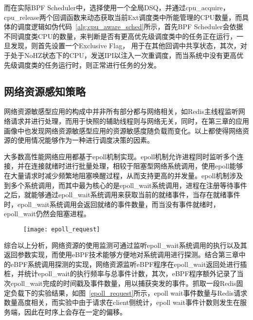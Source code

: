 而在实际BPF Scheduler中，选择使用一个全局DSQ，并通过cpu\_acquire，cpu\_release两个回调函数来动态获取当前Ext调度类中所能管理的CPU数量，而具体的调度逻辑如伪代码~\ref{alg:cpu_aware_sched}所示，首先BPF Scheduler会依据不同调度类CPU的数量，来判断是否有更高优先级调度类中的任务正在运行，一旦发现，则首先设置一个Exclusive Flag， 用于在其他回调中共享状态，其次，对于处于NoHZ状态下的CPU，发送IPI以注入一次重调度，而当系统中没有更高优先级调度类的任务运行时，则正常进行任务的分发。

\subsection{网络资源感知策略}


网络资源敏感型应用的构成中并非所有部分都与网络相关，如Redis主线程监听网络请求并进行处理，而用于快照的辅助线程则与网络无关，同时，在第三章的应用画像中也发现网络资源敏感型应用的资源敏感度随负载而变化。以上都使得网络资源的使用情况能够作为一种进行调度决策的因素。

大多数高性能网络应用都基于epoll机制实现。epoll机制允许进程同时监听多个连接，并在连接就绪时进行批量处理，相较于阻塞型网络系统调用，使用epoll能够在大量请求时减少频繁地阻塞唤醒过程，从而支持更高的并发量。epoll机制涉及到多个系统调用，而其中最为核心的是epoll_wait系统调用，进程在注册等待事件之后，就能够通过epoll_wait系统调用来获取当前的就绪事件，当存在就绪事件时，epoll_wait系统调用会返回就绪的事件数量，而当没有事件就绪时，epoll_wait仍然会阻塞进程。


\begin{figure}[!htbp]
    \centering
    \texttt{[image: epoll\_request]}
    \label{fig:epoll_request}
\end{figure}

综合以上分析，网络资源的使用监测可通过监听epoll_wait系统调用的执行以及其返回参数实现，而使用eBPF技术能够方便地对系统调用进行探测。结合第三章中的eBPF系统调用探测的实现，网络资源监听eBPF程序在epoll_wait返回处进行插桩，并统计epoll_wait的执行频率与总事件计数，其次，eBPF程序额外记录了当次epoll_wait完成的时间戳及事件数量，用以捕获突发的事件。抓取一段Redis固定负载下的实验结果，如图~\ref{epoll_request}所示，epoll wait事件数量与Redis请求数量高度相关，而实验中由于请求在client侧统计，epoll wait事件计数则发生在服务端，因此在时序上会存在一定的偏移。

